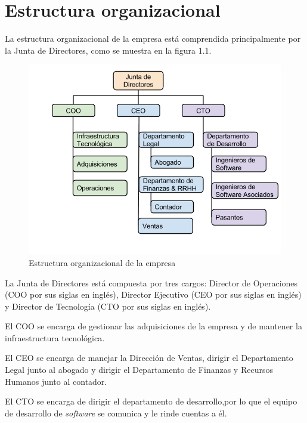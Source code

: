 \section{Estructura organizacional} \label{Estuctura organizacional}

La estructura organizacional de la empresa está comprendida principalmente por la Junta de Directores, como se muestra en la figura 1.1.

\begin{figure}[ht]
  \centering
  \includegraphics[scale=0.45,type=png,ext=.png,read=.png]{imagenes/estructura_empresa}
  \caption{Estructura organizacional de la empresa}
  \label{fig:estructuraEmpresa}
\end{figure}

La Junta de Directores está compuesta por tres cargos: Director de Operaciones (COO por sus siglas en inglés), Director Ejecutivo (CEO por sus siglas en inglés) y Director de Tecnología (CTO por sus siglas en inglés).

El COO se encarga de gestionar las adquisiciones de la empresa y de mantener la infraestructura tecnológica.

El CEO se encarga de manejar la Dirección de Ventas, dirigir el Departamento Legal junto al abogado y dirigir el Departamento de Finanzas y Recursos Humanos junto al contador.

El CTO se encarga de dirigir el departamento de desarrollo,por lo que el equipo de desarrollo de \textit{software} se comunica y le rinde cuentas a él.


